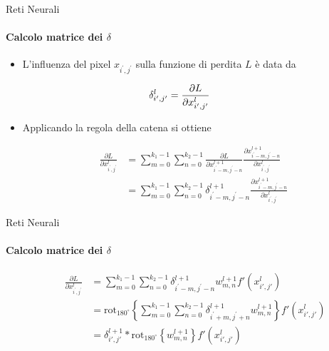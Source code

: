 \documentclass[
 ]{beamer}
\begin{document}
\begin{frame}{Reti Neurali}
    \framesubtitle{Calcolo matrice dei $\delta$}
    
     \begin{itemize} [<+->]
         \setlength\itemsep{2em}
         \item \large L'influenza del pixel $x_{i^{\prime},j^{\prime}}$ sulla funzione di perdita $L$ è data da
         
         \vspace{-0.7em}
         
         \begin{align*}
         \hspace{-1cm}         
               \delta_{i^{\prime},j^{\prime}}^l = \frac{\partial L}{\partial x_{i^{\prime},j^{\prime}}^l}                 
         \end{align*}         
         
         \item \large Applicando la regola della catena si ottiene
     
    \begin{align*}        
           \frac{\partial L}{\partial x_{i^{\prime},j^{\prime}}^{l}} &= \sum_{m = 0}^{k_1 -1} \sum_{n = 0}^{k_2 -1} \frac{\partial L}{\partial x_{i^{\prime}-m, j^{\prime}-n}^{l+1}}\frac{\partial x_{i^{\prime}-m, j^{\prime}-n}^{l+1}}{\partial x_{i^{\prime},j^{\prime}}^l} \\[10pt]            
              &= \sum_{m = 0}^{k_1 -1} \sum_{n = 0}^{k_2 -1} \delta^{l+1}_{i^{\prime}-m, j^{\prime}-n} \frac{\partial x_{i^{\prime}-m, j^{\prime}-n}^{l+1}}{\partial x_{i^{\prime},j^{\prime}}^l}       
     \end{align*}    
    \end{itemize}     
\end{frame}

\begin{frame}{Reti Neurali}
    \framesubtitle{Calcolo matrice dei $\delta$}
   
     
    \begin{align*}
        \hspace{2em}          
          \frac{\partial L}{\partial x_{i^{\prime},j^{\prime}}^{l}} &= \sum_{m = 0}^{k_1 - 1} \sum_{n = 0}^{k_2 - 1} \delta^{l+1}_{i^{\prime} - m,j^{\prime} - n} w_{m,n}^{l+1} f'\left(x_{i',j'}^{l}\right) \\[10pt]
& = \text{rot}_{180^\circ} \left\{ \sum_{m = 0}^{k_1 - 1} \sum_{n = 0}^{k_2 - 1} \delta^{l+1}_{i^{\prime} + m,j^{\prime} + n} w_{m,n}^{l+1} \right\} f'\left(x_{i',j'}^{l}\right) \\[10pt]
&= \delta^{l+1}_{i',j'} \ast \text{rot}_{180^\circ} \left\{ w_{m,n}^{l+1} \right\} f'\left(x_{i',j'}^{l} \right)  
     \end{align*}        
\end{frame}
\end{document}
